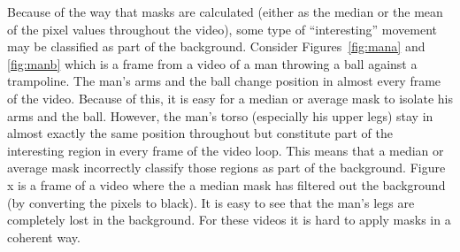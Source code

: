 Because of the way that masks are calculated (either as the median or the mean of the pixel values throughout the video), some type of ``interesting'' movement may be classified as part of the background. Consider Figures~\ref{fig:mana} and \ref{fig:manb} which is a frame from a video of a man throwing a ball against a trampoline. The man's arms and the ball change position in almost every frame of the video. Because of this, it is easy for a median or average mask to isolate his arms and the ball. However, the man's torso (especially his upper legs) stay in almost exactly the same position throughout but constitute part of the interesting region in every frame of the video loop. This means that a median or average mask incorrectly classify those regions as part of the background. Figure x is a frame of a video where the a median mask has filtered out the background (by converting the pixels to black). It is easy to see that the man's legs are completely lost in the background. For these videos it is hard to apply masks in a coherent way. 
